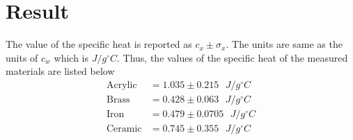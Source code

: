 \documentclass[12pt]{article}
\begin{document}
\section*{Result}
The value of the specific heat is reported as $c_x \pm \sigma_x$.
The units are same as the units of $c_w$ which is $J/g^\circ C$.
Thus, the values of the specific heat of the measured materials are listed below
\begin{align*}
    \text{Acrylic} &= 1.035 \pm 0.215 \text{  }J/g^\circ C\\
    \text{Brass} &= 0.428 \pm 0.063\text{  } J/g^\circ C\\
    \text{Iron} &= 0.479 \pm 0.0705\text{  } J/g^\circ C\\
    \text{Ceramic} &= 0.745 \pm 0.355\text{  } J/g^\circ C
\end{align*}
\end{document}
